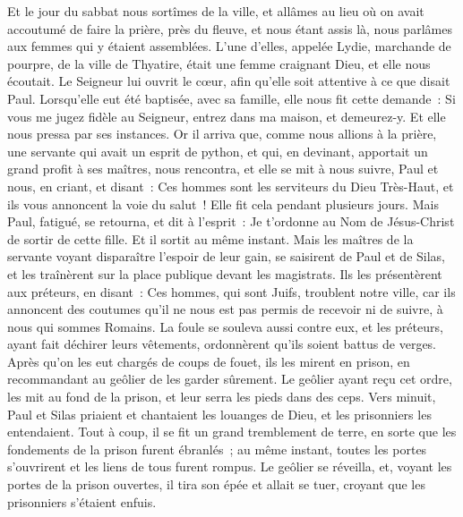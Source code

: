 \begin{multicols}{2}
Et le jour du sabbat nous sortîmes de la ville, et allâmes au lieu où on avait accoutumé de faire la prière, près du fleuve, et nous étant assis là, nous parlâmes aux femmes qui y étaient assemblées.
L'une d'elles, appelée Lydie, marchande de pourpre, de la ville de Thyatire, était une femme craignant Dieu, et elle nous écoutait. Le Seigneur lui ouvrit le cœur, afin qu'elle soit attentive à ce que disait Paul.
Lorsqu'elle eut été baptisée, avec sa famille, elle nous fit cette demande~: Si vous me jugez fidèle au Seigneur, entrez dans ma maison, et demeurez-y. Et elle nous pressa par ses instances.
Or il arriva que, comme nous allions à la prière, une servante qui avait un esprit de python, et qui, en devinant, apportait un grand profit à ses maîtres, nous rencontra,
et elle se mit à nous suivre, Paul et nous, en criant, et disant~: Ces hommes sont les serviteurs du Dieu Très-Haut, et ils vous annoncent la voie du salut~!
Elle fit cela pendant plusieurs jours. Mais Paul, fatigué, se retourna, et dit à l'esprit~: Je t'ordonne au Nom de Jésus-Christ de sortir de cette fille. Et il sortit au même instant.
Mais les maîtres de la servante voyant disparaître l'espoir de leur gain, se saisirent de Paul et de Silas, et les traînèrent sur la place publique devant les magistrats.
Ils les présentèrent aux préteurs, en disant~: Ces hommes, qui sont Juifs, troublent notre ville,
car ils annoncent des coutumes qu'il ne nous est pas permis de recevoir ni de suivre, à nous qui sommes Romains.
La foule se souleva aussi contre eux, et les préteurs, ayant fait déchirer leurs vêtements, ordonnèrent qu'ils soient battus de verges.
Après qu'on les eut chargés de coups de fouet, ils les mirent en prison, en recommandant au geôlier de les garder sûrement.
Le geôlier ayant reçu cet ordre, les mit au fond de la prison, et leur serra les pieds dans des ceps.
Vers minuit, Paul et Silas priaient et chantaient les louanges de Dieu, et les prisonniers les entendaient.
Tout à coup, il se fit un grand tremblement de terre, en sorte que les fondements de la prison furent ébranlés~; au même instant, toutes les portes s'ouvrirent et les liens de tous furent rompus.
Le geôlier se réveilla, et, voyant les portes de la prison ouvertes, il tira son épée et allait se tuer, croyant que les prisonniers s'étaient enfuis.

\end{multicols}
